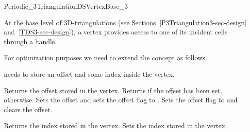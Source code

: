

\begin{ccRefConcept}{Periodic_3TriangulationDSVertexBase_3}

\ccDefinition
  
At the base level of 3D-triangulations 
(see Sections~\ref{P3Triangulation3-sec-design} and~\ref{TDS3-sec-design}),
a vertex provides access to one of its incident cells through a handle.

For optimization purposes we need to extend the concept
 as follows.

\ccRefines {}

 needs to store an offset
and some index inside the vertex.

\ccTypes
{}



\ccAccessFunctions

{Returns the offset stored in the vertex.}
\ccGlue
{}
{Returns  if the offset has been set,  otherwise.}
\ccGlue
{}
{Sets the offset and sets the offset flag to .}
\ccGlue
{}
{Sets the offset flag to  and clears the offset.}

{Returns the index stored in the vertex.}
\ccGlue
{}
{Sets the index stored in the vertex.}

\ccHasModels


\ccSeeAlso

\\
\\



\end{ccRefConcept}
